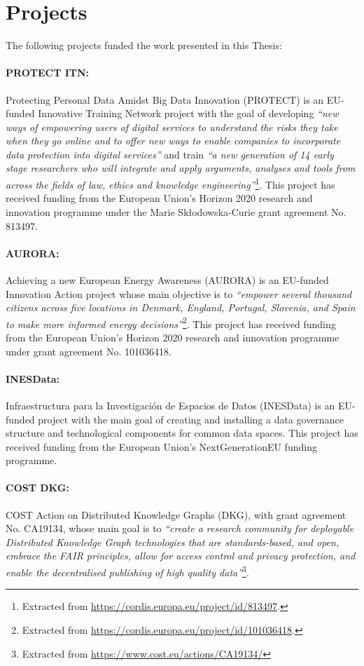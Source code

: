 \section{Projects}
\label{sec:projects}

The following projects funded the work presented in this Thesis:

\paragraph{PROTECT ITN:} Protecting Personal Data Amidst Big Data Innovation (PROTECT) is an EU-funded Innovative Training Network project with the goal of developing \textit{``new ways of empowering users of digital services to understand the risks they take when they go online and to offer new ways to enable companies to incorporate data protection into digital services''} and train \textit{``a new generation of 14 early stage researchers who will integrate and apply arguments, analyses and tools from across the fields of law, ethics and knowledge engineering''}\footnote{Extracted from \url{https://cordis.europa.eu/project/id/813497}.}. This project has received funding from the European Union’s Horizon 2020 research and innovation programme under the Marie Skłodowska-Curie grant agreement No. 813497.

\paragraph{AURORA:} Achieving a new European Energy Awareness (AURORA) is an EU-funded Innovation Action project whose main objective is to \textit{``empower several thousand citizens across five locations in Denmark, England, Portugal, Slovenia, and Spain to make more informed energy decisions''}\footnote{Extracted from \url{https://cordis.europa.eu/project/id/101036418}.}. This project has received funding from the European Union’s Horizon 2020 research and innovation programme under grant agreement No. 101036418.

\paragraph{INESData:} Infraestructura para la Investigación de Espacios de Datos (INESData) is an EU-funded project with the main goal of creating and installing a data governance structure and technological components for common data spaces. This project has received funding from the European Union’s NextGenerationEU funding programme.

\paragraph{COST DKG:} COST Action on Distributed Knowledge Graphs (DKG), with grant agreement No. CA19134, whose main goal is to \textit{``create a research community for deployable Distributed Knowledge Graph technologies that are standards-based, and open, embrace the FAIR principles, allow for access control and privacy protection, and enable the decentralised publishing of high quality data''}\footnote{Extracted from \url{https://www.cost.eu/actions/CA19134/}}.